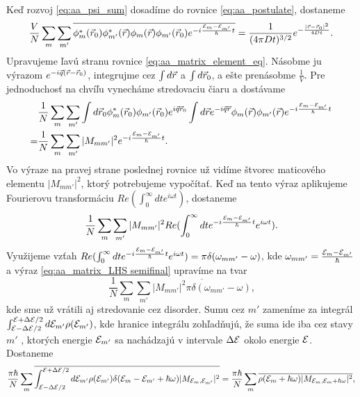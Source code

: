 Keď rozvoj  \eqref{eq:aa_psi_sum} dosadíme do rovnice \eqref{eq:aa_postulate}, dostaneme
\begin{equation}
 \label{eq:aa_matrix_element_eq}
 \frac{V}{N}\sum_m \sum_{m'} \overline{\phi_m^*(\vec{r}_0)\phi^*_{m'}(\vec{r})\phi_m(\vec{r})\phi_{m'}(\vec{r}_0)e^{-i\frac{\mathcal{E}_m-\mathcal{E}_{m'}}{\hbar}t}}=\frac{1}{(4\pi Dt)^{3/2}}e^{-\frac{|\vec{r}-\vec{r}_0|^2}{4Dt}}\text{.}
\end{equation}
Upravujeme ľavú stranu rovnice \eqref{eq:aa_matrix_element_eq}. Násobme ju výrazom $e^{-i\vec{q}(\vec{r}-\vec{r}_0)}$, integrujme cez $\int d\vec{r}$ a $\int d\vec{r}_0$, a ešte prenásobme $\frac{1}{V}$.
Pre jednoduchosť na chvíľu vynecháme stredovaciu čiaru a dostávame
\begin{align*}
&\frac{1}{N}\sum_m \sum_{m'} \int d\vec{r}_0  \phi_m^*(\vec{r}_0)\phi_{m'}(\vec{r}_0) e^{i\vec{q}\vec{r}_0} \int d\vec{r} e^{-i\vec{q}\vec{r}}\phi_m(\vec{r})\phi_{m'}(\vec{r})e^{-i\frac{\mathcal{E}_m-\mathcal{E}_{m'}}{\hbar}t} \\
=&\frac{1}{N}\sum_m \sum_{m'} |M_{mm'}|^2 e^{-i\frac{\mathcal{E}_m-\mathcal{E}_{m'}}{\hbar}t} \text{.}
\end{align*}
Vo výraze na pravej strane poslednej rovnice už vidíme štvorec maticového elementu $|M_{mm'}|^2$, ktorý potrebujeme vypočítať. Keď na tento výraz aplikujeme Fourierovu transformáciu
$Re (\int_0^{\infty} dt e^{i\omega t})$, dostaneme
\begin{equation}
 \label{eq:aa_matrix_LHS semifinal}
\frac{1}{N}\sum_m \sum_{m'} |M_{mm'}|^2 Re (\int_0^{\infty} dt e^{-i\frac{\mathcal{E}_m-\mathcal{E}_{m'}}{\hbar}t} e^{i\omega t}) \text{.}
\end{equation}
Využijeme vzťah $Re(\int_0^{\infty} dt e^{-i\frac{\mathcal{E}_m-\mathcal{E}_{m'}}{\hbar}t} e^{i\omega t})=\pi \delta(\omega_{mm'}-\omega)$, kde $\omega_{mm'}=\frac{\mathcal{E}_m-\mathcal{E}_{m'}}{\hbar}$ a
výraz  \eqref{eq:aa_matrix_LHS semifinal} upravíme na tvar
\begin{equation}
 \label{eq:aa_matrix_LHS}
 \frac{1}{N}\sum_m \sum_{m'} \overline{|M_{mm'}|^2 \pi \delta(\omega_{mm'}-\omega)} \text{,}
\end{equation}
kde sme už vrátili aj stredovanie cez disorder. Sumu cez $m'$ zameníme za integrál $\int_{\mathcal{E}-\Delta \mathcal{E}/2}^{\mathcal{E}+\Delta \mathcal{E}/2} d\mathcal{E}_{m'} \rho(\mathcal{E}_{m'})$, kde hranice integrálu zohľadňujú,
že suma ide iba cez stavy  $m'$ , ktorých energie $\mathcal{E}_{m'}$ sa nachádzajú v intervale $\Delta \mathcal{E}$ okolo energie $\mathcal{E}$. Dostaneme
\begin{equation}
\label{eq:aa_vysl}
 \frac{\pi \hbar}{N}\sum_m  \overline{\int_{\mathcal{E}-\Delta \mathcal{E}/2}^{\mathcal{E}+\Delta \mathcal{E}/2}  d\mathcal{E}_{m'} \rho(\mathcal{E}_{m'}) \delta(\mathcal{E}_m-\mathcal{E}_{m'}+\hbar \omega) |M_{\mathcal{E}_{m}, \mathcal{E}_{m'}}|^2} =\frac{\pi \hbar}{N}\sum_m \overline{\rho(\mathcal{E}_{m}+\hbar\omega)|M_{\mathcal{E}_{m}, \mathcal{E}_{m}+\hbar\omega}|^2} \text{,}
\end{equation}
